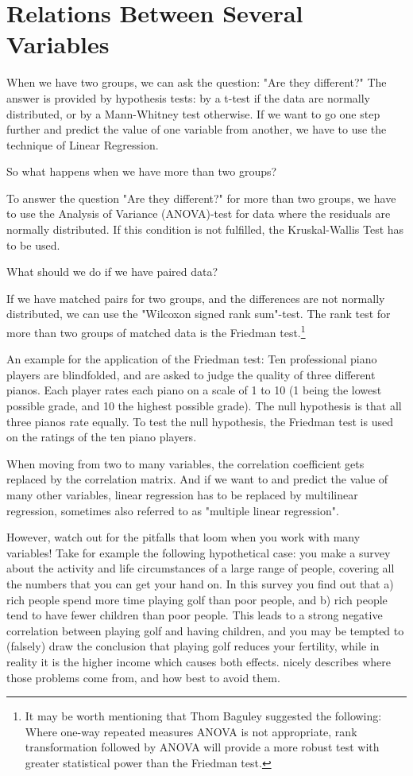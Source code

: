 \chapter{Relations Between Several Variables}

When we have two groups, we can ask the question: "Are they different?" The answer is provided by hypothesis tests: by a t-test if the data are normally distributed, or by a Mann-Whitney test otherwise. If we want to go one step further and predict the value of one variable from another, we have to use the technique of Linear Regression.

So what happens when we have more than two groups?

To answer the question "Are they different?" for more than two groups, we have to use the Analysis of Variance (ANOVA)-test for data where the residuals are normally distributed. If this condition is not fulfilled, the Kruskal-Wallis Test has to be used.

What should we do if we have paired data?

If we have matched pairs for two groups, and the differences are not normally distributed, we can use the "Wilcoxon signed rank sum"-test. The rank test for more than two groups of matched data is the Friedman test.\footnote{It may be worth mentioning that Thom Baguley suggested the following: Where one-way repeated measures ANOVA is not appropriate, rank transformation followed by ANOVA will provide a more robust test with greater statistical power than the Friedman test.}

An example for the application of the Friedman test: Ten professional piano players are blindfolded, and are asked to judge the quality of three different pianos. Each player rates each piano on a scale of 1 to 10 (1 being the lowest possible grade, and 10 the highest possible grade). The null hypothesis is that all three pianos rate equally. To test the null hypothesis, the Friedman test is used on the ratings of the ten piano players.

When moving from two to many variables, the correlation coefficient gets replaced by the correlation matrix. And if we want to and predict the value of many other variables, linear regression has to be replaced by multilinear regression, sometimes also referred to as "multiple linear regression".

However, watch out for the pitfalls that loom when you work with many variables! Take for example the following hypothetical case: you make a survey about the activity and life circumstances of a large range of people, covering all the numbers that you can get your hand on. In this survey you find out that a) rich people spend more time playing golf than poor people, and b) rich people tend to have fewer children than poor people. This leads to a strong negative correlation between playing golf and having children, and you may be tempted to (falsely) draw the conclusion that playing golf reduces your fertility, while in reality it is the higher income which causes both effects. \cite{Kaplan2009} nicely describes where those problems come from, and how best to avoid them.

